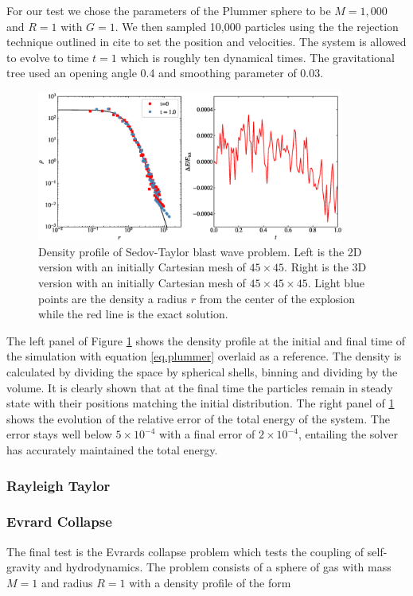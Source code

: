 For our test we chose the parameters of the Plummer sphere to be $M=1,000$ and $R=1$ with
$G=1$. We then sampled 10,000 particles using the the rejection technique outlined in
cite to set the position and velocities. The system is allowed to evolve to time $t=1$
which is roughly ten dynamical times. The gravitational tree used an opening angle 0.4
and smoothing parameter of 0.03.
\begin{figure}
    \begin{center}
        \includegraphics[width=0.9\textwidth]{figures/plummer.eps}
        \caption{Density profile of Sedov-Taylor blast wave problem. Left is the 2D version with an initially
        Cartesian mesh of $45 \times 45$. Right is the 3D version with an initially Cartesian mesh of 
        $45 \times 45 \times 45$. Light blue points are the density a radius $r$ from the center of the explosion
        while the red line is the exact solution.}
        \label{fig.plummer}
    \end{center}
\end{figure}
The left panel of Figure \ref{fig.plummer} shows the density profile at the initial and final 
time of the simulation with equation \ref{eq.plummer} overlaid as a reference. The density is calculated
by dividing the space by spherical shells, binning and dividing by the volume. It is clearly shown that
at the final time the particles remain in steady state with their positions matching the initial
distribution. The right panel of \ref{fig.plummer} shows the evolution of the relative error of the
total energy of the system. The error stays well below $5\times 10^{-4}$ with a final error of
$2\times 10^{-4}$, entailing the solver has accurately maintained the total energy.

\subsubsection{Rayleigh Taylor}

\subsubsection{Evrard Collapse}
The final test is the Evrards collapse problem which tests the coupling of self-gravity and hydrodynamics.
The problem consists of a sphere of gas with mass $M=1$ and radius $R=1$ with a density profile of
the form

